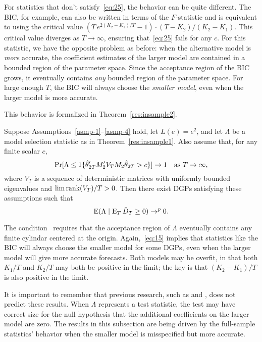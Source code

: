 \documentclass[12pt]{article}
\begin{document}
For statistics that don't satisfy~\eqref{eq:25}, the behavior can be
quite different. The BIC, for example, can also be written in terms of
the $F$-statistic and is equivalent to using the critical value $(T \,
e^{2 (K_2 - K_1) / T} - 1) \cdot (T - K_2) / (K_2 - K_1)$. This
critical value diverges as $T \to \infty$, ensuring that~\eqref{eq:25}
fails for any $c$. For this statistic, we have the opposite problem as
before: when the alternative model is \emph{more} accurate, the
coefficient estimates of the larger model are contained in a bounded
region of the parameter space. Since the acceptance region of the BIC
grows, it eventually contains \emph{any} bounded region of the
parameter space. For large enough $T$, the BIC will always choose the
\emph{smaller model}, even when the larger model is more accurate.

This behavior is formalized in Theorem~\ref{res:insample2}.
\begin{thm}\label{res:insample2}
  Suppose Assumptions~\ref{asmp-1}--\ref{asmp-4} hold, let $L(e) =
  e^2$, and let $\Lambda$ be a model selection statistic as in
  Theorem~\ref{res:insample1}. Also assume that, for any finite scalar
  $c$,
  \begin{equation}\label{eq:27}
    \Pr[\Lambda \leq \operatorname{1}\{\hat\theta_{2T}'M_2' V_T M_2\hat\theta_{2T} > c \}] \to 1
    \quad \text{as } T \to \infty,
  \end{equation}
  where $V_T$ is a sequence of deterministic matrices with uniformly
  bounded eigenvalues and $\lim \operatorname*{rank}(V_T)/T > 0$. Then there exist
  DGPs satisfying these assumptions such that
  \begin{equation}\label{eq:15}
    \operatorname{E}( \Lambda \mid \operatorname{E}_T \bar{D}_{T} \geq 0 ) \to^p 0.
  \end{equation}
\end{thm}

The condition~\label{eq:27} requires that the acceptance region of
$\Lambda$ eventually contains any finite cylindar centered at the
origin. Again,~\eqref{eq:15} implies that statistics like the BIC
will always choose the smaller model for some DGPs, even when the
larger model will give more accurate forecasts. Both models may be
overfit, in that both $K_1/T$ and $K_2/T$ may both be positive in the
limit; the key is that $(K_2 - K_1)/T$ is also positive in the limit.

It is important to remember that previous research, such as
\citet{Cal:11c} and \citet{Ana:12}, does not predict these
results. When $\Lambda$ represents a test statistic, the test may have
correct size for the null hypothesis that the additional coefficients
on the larger model are zero. The results in this subsection are being
driven by the full-sample statistics' behavior when the smaller model
is misspecified but more accurate.
\end{document}
